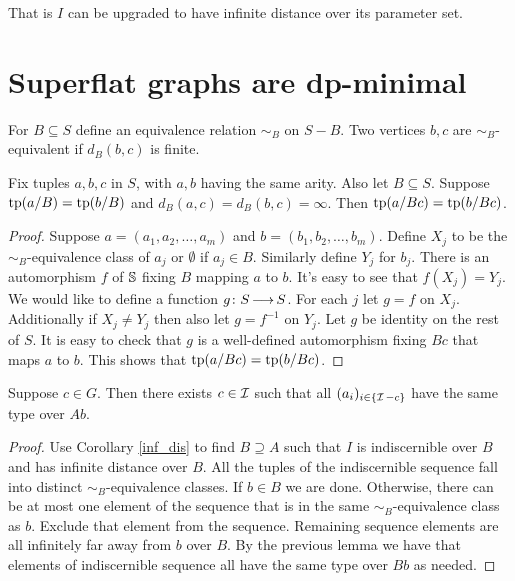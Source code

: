 That is $I$ can be upgraded to have infinite distance over its parameter set.

\section{Superflat graphs are dp-minimal}

\begin{Definition}
  For $B \subseteq S$ define an equivalence relation $\sim_B$ on $S - B$.
  Two vertices $b,c$ are $\sim_B$-equivalent if $d_B(b,c)$ is finite.
\end{Definition}

\begin{Lemma}
  Fix tuples $a,b,c$ in $S$, with $a,b$ having the same arity.
  Also let $B \subseteq S$.
  Suppose $\operatorname{tp}(a/B) = \operatorname{tp}(b/B)$ and $d_B(a, c) = d_B(b, c) = \infty$.
  Then $\operatorname{tp}(a/Bc) = \operatorname{tp}(b/Bc)$.
\end{Lemma}

\begin{proof}
  Suppose $a = (a_1, a_2, \ldots, a_m)$ and $b = (b_1, b_2, \ldots, b_m)$.
  Define $X_j$ to be the $\sim_B$-equivalence class of $a_j$ or $\emptyset$ if $a_j \in B$.
  Similarly define $Y_j$ for $b_j$.
  There is an automorphism $f$ of $\mathbb S$ fixing $B$ mapping $a$ to $b$.
  It's easy to see that $f(X_j) = Y_j$.
  We would like to define a function $g \colon S \operatorname{\longrightarrow} S$.
  For each $j$ let $g = f$ on $X_j$.
  Additionally if $X_j \neq Y_j$ then also let $g = f^{-1}$ on $Y_j$.
  Let $g$ be identity on the rest of $S$.
  It is easy to check that $g$ is a well-defined automorphism fixing $Bc$ that maps $a$ to $b$.
  This shows that $\operatorname{tp}(a/Bc) = \operatorname{tp}(b/Bc)$.
\end{proof}

\begin{Lemma} \label{exclude}
  Suppose $c \in G$.
  Then there exists $c \in \operatorname{\mathcal I}$ such that all $(a_i)_{i\in\{\operatorname{\mathcal I} - c\}}$ have the same type over $Ab$.
\end{Lemma}

\begin{proof}
  Use Corollary \ref{inf_dis} to find $B \supseteq A$ such that $I$ is indiscernible over $B$ and has infinite distance over $B$.
  All the tuples of the indiscernible sequence fall into distinct $\sim_B$-equivalence classes.
  If $b \in B$ we are done.
  Otherwise, there can be at most one element of the sequence that is in the same $\sim_B$-equivalence class as $b$.
  Exclude that element from the sequence.
  Remaining sequence elements are all infinitely far away from $b$ over $B$.
  By the previous lemma we have that elements of indiscernible sequence all have the same type over $Bb$ as needed.
\end{proof}


